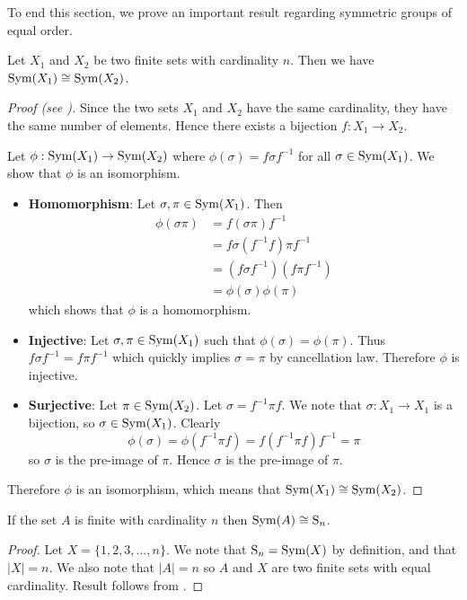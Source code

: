 To end this section, we prove an important result regarding symmetric groups of equal order.
\begin{theorem}\label{thrm-symmetric-groups-of-same-order-are-isomorphic}
    Let $X_1$ and $X_2$ be two finite sets with cardinality $n$. Then we have $\mathrm{Sym}(X_1) \cong \mathrm{Sym}(X_2)$.
\end{theorem}
\begin{proof}[Proof (see {\cite[Proof 2]{proofwiki_symmetric-group-of-same-order-are-isomorphic}})]
    Since the two sets $X_1$ and $X_2$ have the same cardinality, they have the same number of elements. Hence there exists a bijection $f: X_1 \to X_2$.

    Let $\phi: \mathrm{Sym}(X_1) \to \mathrm{Sym}(X_2)$ where $\phi(\sigma) = f\sigma f^{-1}$ for all $\sigma \in \mathrm{Sym}(X_1)$. We show that $\phi$ is an isomorphism.
    \begin{itemize}
        \item \textbf{Homomorphism}: Let $\sigma, \pi \in \mathrm{Sym}(X_1)$. Then
        \begin{align*}
            \phi(\sigma\pi) &= f(\sigma\pi)f^{-1}\\
            &= f\sigma(f^{-1}f)\pi f^{-1}\\
            &= (f\sigma f^{-1})(f\pi f^{-1})\\
            &= \phi(\sigma)\phi(\pi)
        \end{align*}
        which shows that $\phi$ is a homomorphism.

        \item \textbf{Injective}: Let $\sigma, \pi \in \mathrm{Sym}(X_1)$ such that $\phi(\sigma) = \phi(\pi)$. Thus $f\sigma f^{-1} = f\pi f^{-1}$ which quickly implies $\sigma = \pi$ by cancellation law. Therefore $\phi$ is injective.

        \item \textbf{Surjective}: Let $\pi \in \mathrm{Sym}(X_2)$. Let $\sigma = f^{-1}\pi f$. We note that $\sigma: X_1 \to X_1$ is a bijection, so $\sigma \in \mathrm{Sym}(X_1)$. Clearly
        \[
            \phi(\sigma) = \phi(f^{-1}\pi f) = f(f^{-1}\pi f)f^{-1} = \pi
        \]
        so $\sigma$ is the pre-image of $\pi$. Hence $\sigma$ is the pre-image of $\pi$.
    \end{itemize}
    Therefore $\phi$ is an isomorphism, which means that $\mathrm{Sym}(X_1) \cong \mathrm{Sym}(X_2)$.
\end{proof}

\begin{corollary}\label{corollary-symmetric-group-of-finite-order}
    If the set $A$ is finite with cardinality $n$ then $\mathrm{Sym}(A) \cong \mathrm{S}_{n}$.
\end{corollary}
\begin{proof}
    Let $X = \{1, 2, 3, \dots, n\}$. We note that $\mathrm{S}_{n} = \mathrm{Sym}(X)$ by definition, and that $|X| = n$. We also note that $|A| = n$ so $A$ and $X$ are two finite sets with equal cardinality. Result follows from .
\end{proof}

